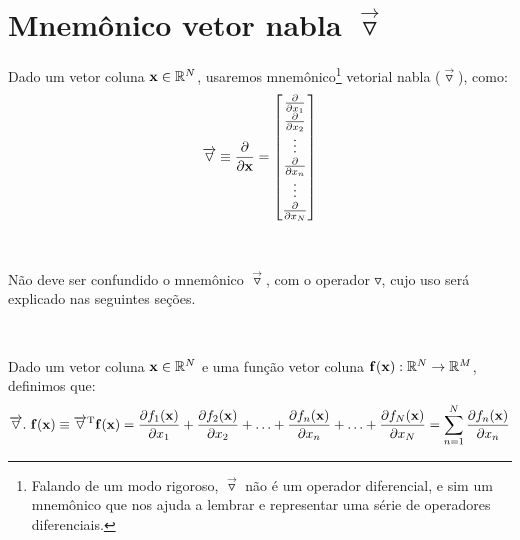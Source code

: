 \section{Mnemônico vetor nabla $\vec{\triangledown}$}

\begin{notation}
Dado um vetor coluna $\VECTOR{x}\in \mathbb{R}^N$, usaremos mnemônico\footnote{Falando de um modo rigoroso, 
 $\overrightarrow{\triangledown}$ não é um operador diferencial, 
e sim um mnemônico que nos ajuda a lembrar e representar uma série de operadores diferenciais.} 
vetorial nabla ($\overrightarrow{\triangledown}$), como:
\begin{equation}
\overrightarrow{\triangledown}  \equiv \frac{\partial }{\partial \VECTOR{x}} =
\begin{bmatrix}
\frac{\partial  }{\partial x_{1}}\\
\frac{\partial  }{\partial x_{2}}\\
\vdots\\
\frac{\partial  }{\partial x_{n}}\\
\vdots\\
\frac{\partial  }{\partial x_{N}}
\end{bmatrix}
\end{equation}
\end{notation}
~

\begin{tcbattention}
Não deve ser confundido o mnemônico $\overrightarrow{\triangledown}$, 
com o operador $\triangledown$, cujo uso será explicado nas seguintes seções.
\end{tcbattention}
~

\begin{definition}
\label{def:nabla:dot}
Dado 
um vetor coluna $\VECTOR{x}\in \mathbb{R}^N$ e 
uma função vetor coluna $\VECTOR{f}(\VECTOR{x}): \mathbb{R}^N \rightarrow \mathbb{R}^M$, 
definimos que:
\begin{equation}
\overrightarrow{\triangledown}.~\VECTOR{f}(\VECTOR{x}) \equiv
\overrightarrow{\triangledown}^{\transpose}\VECTOR{f}(\VECTOR{x})= 
\frac{\partial f_{1}(\VECTOR{x}) }{\partial x_{1}}+
\frac{\partial f_{2}(\VECTOR{x}) }{\partial x_{2}}+
\hdots+
\frac{\partial f_{n}(\VECTOR{x}) }{\partial x_{n}}+
\hdots+
\frac{\partial f_{N}(\VECTOR{x}) }{\partial x_{N}}=
\sum \limits_{n=1}^N \frac{\partial f_{n}(\VECTOR{x}) }{\partial x_{n}}
\end{equation}

\end{definition}
